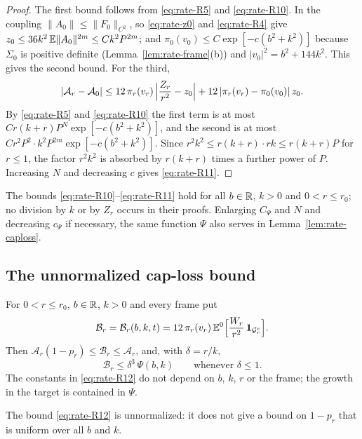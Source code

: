 \begin{proof}
The first bound follows from \eqref{eq:rate-R5} and \eqref{eq:rate-R10}. In the coupling $\|A_0\|\le\|F_0\|_{C^2}$, so \eqref{eq:rate-z0} and \eqref{eq:rate-R4} give $z_0\le36k^2\,\mathbb E\|A_0\|^{2m}\le Ck^2P^{2m}$; and $\pi_0(v_0)\le C\exp[-c(b^2+k^2)]$ because $\Sigma_0$ is positive definite (Lemma~\ref{lem:rate-frame}(b)) and $|v_0|^2=b^2+144k^2$. This gives the second bound. For the third,
\[
|\mathcal A_r-\mathcal A_0|\le12\,\pi_r(v_r)\,\Bigl|\frac{Z_r}{r^2}-z_0\Bigr|+12\,|\pi_r(v_r)-\pi_0(v_0)|\,z_0 .
\]
By \eqref{eq:rate-R5} and \eqref{eq:rate-R10} the first term is at most $Cr(k+r)P^N\exp[-c(b^2+k^2)]$, and the second is at most $Cr^2P^2\cdot k^2P^{2m}\exp[-c(b^2+k^2)]$. Since $r^2k^2\le r(k+r)\cdot rk\le r(k+r)P$ for $r\le1$, the factor $r^2k^2$ is absorbed by $r(k+r)$ times a further power of $P$. Increasing $N$ and decreasing $c$ gives \eqref{eq:rate-R11}.
\end{proof}

The bounds \eqref{eq:rate-R10}--\eqref{eq:rate-R11} hold for all $b\in\mathbb R$, $k>0$ and $0<r\le r_0$; no division by $k$ or by $Z_r$ occurs in their proofs. Enlarging $C_\Psi$ and $N$ and decreasing $c_\Psi$ if necessary, the same function $\Psi$ also serves in Lemma~\ref{lem:rate-caploss}.

\subsection*{The unnormalized cap-loss bound}

\begin{lemma}\label{lem:rate-caploss}
For $0<r\le r_0$, $b\in\mathbb R$, $k>0$ and every frame put
\begin{equation}\label{eq:rate-B}
\mathcal B_r=\mathcal B_r(b,k,t)=12\,\pi_r(v_r)\,\mathbb E^0\Bigl[\frac{W_r}{r^2}\,\mathbf 1_{\mathcal G_r^c}\Bigr].
\end{equation}
Then $\mathcal A_r(1-p_r)\le\mathcal B_r\le\mathcal A_r$, and, with $\delta=r/k$,
\begin{equation}\label{eq:rate-R12}
\mathcal B_r\le\delta^3\,\Psi(b,k)\qquad\text{whenever }\delta\le1 .
\end{equation}
The constants in \eqref{eq:rate-R12} do not depend on $b$, $k$, $r$ or the frame; the growth in the target is contained in $\Psi$.
\end{lemma}

The bound \eqref{eq:rate-R12} is unnormalized: it does not give a bound on $1-p_r$ that is uniform over all $b$ and $k$.

